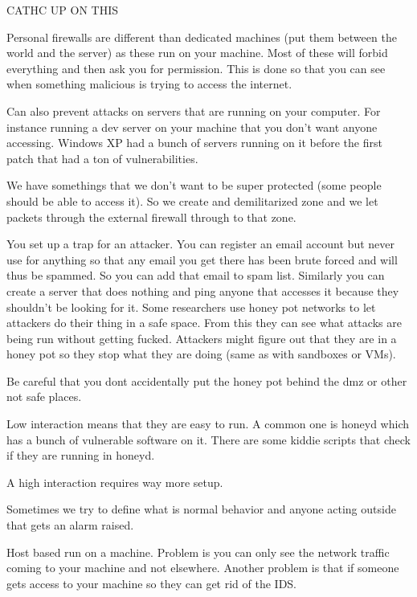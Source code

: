 \documentclass{article}
\begin{document}




CATHC UP ON THIS




Personal firewalls are different than dedicated machines (put them between the world and the server) as these run on your machine. Most of these will forbid everything and then ask you for permission. This is done so that you can see when something malicious is trying to access the internet. 


Can also prevent attacks on servers that are running on your computer. For instance running a dev server on your machine that you don't want anyone accessing. Windows XP had a bunch of servers running on it before the first patch that had a ton of vulnerabilities. 


We have somethings that we don't want to be super protected (some people should be able to access it). So we create and demilitarized zone and we let packets through the external firewall through to that zone.


You set up a trap for an attacker. You can register an email account but never use for anything so that any email you get there has been brute forced and will thus be spammed. So you can add that email to spam list. Similarly you can create a server that does nothing and ping anyone that accesses it because they shouldn't be looking for it. Some researchers use honey pot networks to let attackers do their thing in a safe space. From this they can see what attacks are being run without getting fucked. Attackers might figure out that they are in a honey pot so they stop what they are doing (same as with sandboxes or VMs). 

Be careful that you dont accidentally put the honey pot behind the dmz or other not safe places.


Low interaction means that they are easy to run. A common one is honeyd which has a bunch of vulnerable software on it. There are some kiddie scripts that check if they are running in honeyd. 

A high interaction requires way more setup. 


Sometimes we try to define what is normal behavior and anyone acting outside that gets an alarm raised.


Host based run on a machine. Problem is you can only see the network traffic coming to your machine and not elsewhere. Another problem is that if someone gets access to your machine so they can get rid of the IDS.
\end{document}
